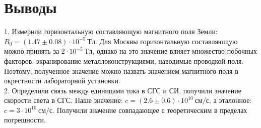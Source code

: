 \documentclass[a4paper, 12pt]{article}%
\begin{document}
\section{Выводы}
1. Измерили горизонтальную составляющую магнитного поля Земли: 	$B_0 = (1.47 \pm 0.08) \cdot 10^{-5} ~Тл$. Для Москвы горизонтальную составляющую можно принять за $2 \cdot 10^{-5} ~Тл$, однако на это значение влияет множество побочных факторов: экранирование металлоконструкциями, наводимые проводкой поля. Поэтому, полученное значение можно назвать значением магнитного поля в окрестности лабораторной установки. \\
2. Определили связь между единицами тока в СГС и СИ, получили значение скорости света в СГС. Наше значение: $	c  = (2.6 \pm 0.6) \cdot 10^{10}~см/с$, а эталонное: $	c = 3 \cdot 10^{10}~см/с$. Получили значение совпадающее с теоретическим в пределах погрешности.
\end{document}
